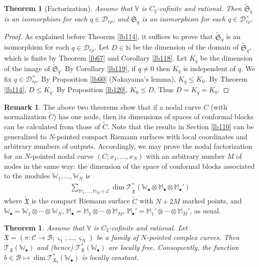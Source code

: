 \documentclass[12pt,b5paper,notitlepage]{report}
\theoremstyle{definition}
\newtheorem{rem}[df]{Remark}
\theoremstyle{plain}
\newtheorem{thm}[df]{Theorem}
\newcommand{\fk}{\mathfrak}
\newcommand{\mc}{\mathcal}
\newcommand{\wtd}{\widetilde}
\newcommand{\scr}{\mathscr}
\newcommand{\sgm}{\varsigma}
\newcommand{\blt}{\bullet}
\newcommand{\Vbb}{\mathbb V}
\newcommand{\Wbb}{\mathbb W}
\newcommand{\Mbb}{\mathbb M}
\newcommand{\Nbb}{\mathbb N}
\numberwithin{equation}{section}
\begin{document}
\begin{thm}[Factorization]\label{lb135}
Assume that $\Vbb$ is $C_2$-cofinite and rational. Then $\wtd{\fk S}_q$ is an isomorphism for each $q\in\mc D_{r\rho}$, and $\fk S_q$ is an isomorphism for each $q\in\mc D_{r\rho}^\times$.
\end{thm}

\begin{proof}
As explained before Theorem \ref{lb114}, it suffices to prove that $\wtd{\fk S}_q$ is an isomorphism for each $q\in\mc D_{r\rho}$.  Let $D\in\Nbb$ be the dimension of the domain of $\wtd{\fk S}_q$, which is finite by Theorem \ref{lb67} and Corollary \ref{lb118}. Let $K_q$ be the dimension of the image of $\wtd{\fk S}_q$. By Corollary \ref{lb119}, if $q\neq 0$ then $K_q$ is independent of $q$. We fix $q\in\mc D_{r\rho}^\times$. By Proposition \ref{lb60} (Nakayama's lemma), $K_q\leq K_0$. By Theorem \ref{lb114}, $D\leq K_q$. By Proposition \ref{lb120}, $K_0\leq D$. Thus $D=K_q=K_0$.
\end{proof}



\begin{rem}\label{lb136}
The above two theorems show that if a nodal curve $C$ (with normalization $\wtd C$) has one node, then its dimensions of spaces of conformal blocks can be calculated from those of $\wtd C$. Note that the results in Section \ref{lb110} can be generalized to $N$-pointed compact Riemann surfaces with local coordinates and arbitrary numbers  of outputs. Accordingly, we may prove the nodal factorization for an $N$-pointed nodal curve $(C;x_1,\dots,x_N)$ with an arbitrary number $M$ of nodes in the same way: the dimension of the space of conformal blocks associated to the modules $\Wbb_1,\dots,\Wbb_N$ is
\begin{align}
\sum_{\Mbb_1,\dots,\Mbb_M\in\mc E} \dim\scr T_{\wtd{\fk X}}^*(\Wbb_\blt\otimes\Mbb_\blt\otimes\Mbb_\blt')\label{eq243}
\end{align}
where $\wtd{\fk X}$ is the compact Riemann surface $\wtd C$ with $N+2M$ marked points, and $\Wbb_\blt=\Wbb_1\otimes\cdots\otimes\Wbb_N$, $\Mbb_\blt=\Mbb_1\otimes\cdots\otimes\Mbb_M$, $\Mbb_\blt'=\Mbb_1'\otimes\cdots\otimes\Mbb_M'$, as usual.
\end{rem}



\begin{thm}
Assume that $\Vbb$ is $C_2$-cofinite and rational. Let $\fk X=(\pi:\mc C\rightarrow\mc B;\sgm_1,\dots,\sgm_N)$ be a family of $N$-pointed complex curves. Then $\scr T_{\fk X}(\Wbb_\blt)$ and (hence) $\scr T_{\fk X}^*(\Wbb_\blt)$ are locally free. Consequently, the function $b\in\mc B\mapsto \dim\scr T_{\fk X_b}^*(\Wbb_\blt)$ is locally constant.
\end{thm}
\end{document}
